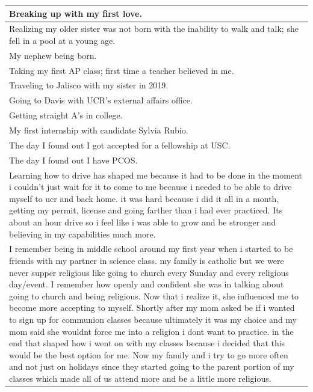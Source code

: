 \documentclass[
  .7em,
  letterpaper,
  DIV=11,
  numbers=noendperiod]{scrartcl}
\begin{document}
\begin{table}
\begin{tabular}{l}
Breaking up with my first love.\\
\hline
Realizing my older sister was not born with the inability to walk and talk; she fell in a pool at a young age.\\
\hline
My nephew being born.\\
\hline
Taking my first AP class; first time a teacher believed in me.\\
\hline
Traveling to Jalisco with my sister in 2019.\\
\hline
Going to Davis with UCR's external affairs office.\\
\hline
Getting straight A's in college.\\
\hline
My first internship with candidate Sylvia Rubio.\\
\hline
The day I found out I got accepted for a fellowship at USC.\\
\hline
The day I found out I have PCOS.\\
\hline
Learning how to drive has shaped me because it had to be done in the moment i couldn't just wait for it to come to me because i needed to be able to drive myself to ucr and back home. it was hard because i did it all in a month, getting my permit, license and going farther than i had ever practiced. Its about an hour drive so i feel like i was able to grow and be stronger and believing in my capabilities much more.\\
\hline
I remember being in middle school around my first year when i started to be friends with my partner in science class. my family is catholic but we were never supper religious like going to church every Sunday and every religious day/event. I remember how openly and confident she was in talking about going to church and being religious. Now that i realize it, she influenced me to become more accepting to myself. Shortly after my mom asked be if i wanted to sign up for communion classes because ultimately it was my choice and my mom said she wouldnt force me into a religion i dont want to practice. in the end that shaped how i went on with my classes because i decided that this would be the best option for me. Now my family and i try to go more often and not just on holidays since they started going to the parent portion of my classes which made all of us attend more and be a little more religious.\\
\hline

\end{tabular}
\end{table}
\end{document}
